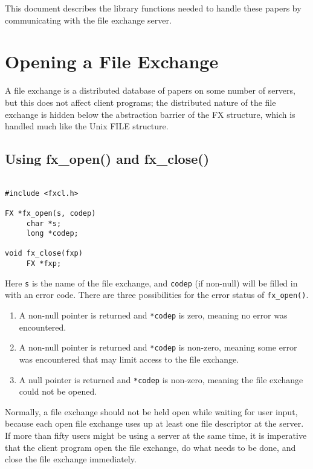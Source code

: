 This document describes the library functions needed to handle these
papers by communicating with the file exchange server.

\pagebreak[3]

\section{Opening a File Exchange}

A file exchange is a distributed database of papers on some number of
servers, but this does not affect client programs; the distributed
nature of the file exchange is hidden below the abstraction barrier of
the FX structure, which is handled much like the Unix FILE structure.

\subsection{Using fx\_open() and fx\_close()}

\begin{verbatim}

#include <fxcl.h>

FX *fx_open(s, codep)
     char *s;
     long *codep;

void fx_close(fxp)
     FX *fxp;

\end{verbatim}

Here \verb+s+ is the name of the file exchange, and \verb+codep+ (if
non-null) will be filled in with an error code.  There are three
possibilities for the error status of \verb+fx_open()+.

\begin{enumerate}

\item A non-null pointer is returned and \verb+*codep+ is zero,
meaning no error was encountered.

\item A non-null pointer is returned and \verb+*codep+ is non-zero,
meaning some error was encountered that may limit access to the file
exchange.

\item A null pointer is returned and \verb+*codep+ is non-zero,
meaning the file exchange could not be opened.

\end{enumerate}

Normally, a file exchange should not be held open while waiting for
user input, because each open file exchange uses up at least one file
descriptor at the server.  If more than fifty users might be using a
server at the same time, it is imperative that the client program open
the file exchange, do what needs to be done, and close the file
exchange immediately.

